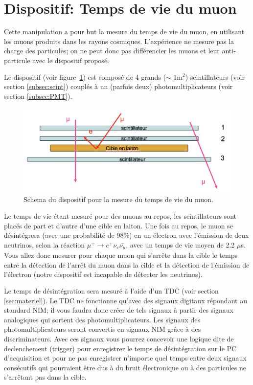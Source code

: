 \section{Dispositif: Temps de vie du muon}

Cette manipulation a pour but la mesure du temps de vie du muon, en utilisant
les muons produits dans les rayons cosmiques. L'exp\'erience ne mesure pas la
charge des particules; on ne peut donc pas diff\'erencier les muons et
leur anti-particule avec le dispositif propos\'e.

Le dispositif (voir figure~\ref{fig:TpsVieMuon_disp}) est compos\'e de 4 grands ($\sim$ 1m$^2$) scintillateurs (voir section
\ref{subsec:scint}) coupl\'es \`a un (parfois deux) photomultiplicateurs (voir section \ref{subsec:PMT}).

\begin{figure}[!h]
    \centering
	\includegraphics[width=\textwidth]{figures/Schema-Tps-de-vie.png}
    \caption{Schema du dispositif pour la mesure du temps de vie du muon.}
    \label{fig:TpsVieMuon_disp} 
\end{figure}

Le temps de vie \'etant mesur\'e pour des muons au repos, les scintillateurs sont plac\'es de part et d'autre d'une cible en laiton.
Une fois au repos, le muon se d\'esint\'egrera (avec une probabilit\'e de 98$\%$) en un
\'electron avec l'\'emission de deux neutrinos, selon la r\'eaction
$\mu^+ \rightarrow e^+ \nu_e \bar{\nu_{\mu}}$, avec un temps de vie moyen de 2.2 $\mu$s.
Vous allez donc mesurer pour chaque muon qui s'arr\^ete dans la cible le temps
entre la d\'etection de l'arr\^et du muon dans la cible et la d\'etection de
l'\'emission de l'\'electron (notre dispositif est incapable de d\'etecter
les neutrinos).

Le temps de d\'esint\'egration sera mesur\'e \`a l'aide d'un TDC (voir section \ref{sec:materiel}).
Le TDC ne fonctionne qu'avec des signaux digitaux répondant au standard NIM;
il vous faudra donc cr\'eer de tels signaux \`a  partir des signaux analogiques
qui sortent des photomultiplicateurs. Les signaux des photomultiplicateurs seront convertis en signaux NIM grâce à des discriminateurs. Avec ces signaux vous
pourrez concevoir une logique dite de declenchement (trigger) pour enregistrer
le temps de d\'esint\'egration sur le PC d'acquisition et pour ne pas
enregistrer n'importe quel temps entre deux signaux consécutifs qui pourraient
\^etre dus \`a du bruit \'electronique ou \`a des particules ne s'arr\^etant pas dans la cible.

